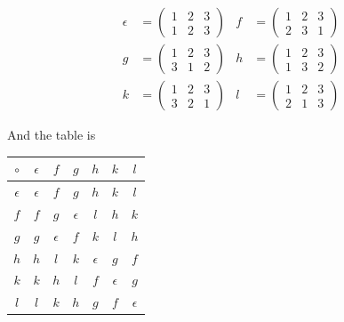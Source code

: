 \documentclass[twoside]{amsart}
\newcommand{\eps}{\ensuremath{\epsilon}\xspace}
\begin{document}
\begin{enumerate}[A.]
\begin{enumerate}[1]
      \begin{align*}
          \eps &= \begin{pmatrix}
	             1 & 2 & 3 \\
		     1 & 2 & 3
		  \end{pmatrix}
		  &
	  f    &= \begin{pmatrix}
	             1 & 2 & 3 \\
		     2 & 3 & 1
		  \end{pmatrix}
		  \\
	  g    &= \begin{pmatrix}
	             1 & 2 & 3 \\
		     3 & 1 & 2
		  \end{pmatrix}
		  &
          h    &= \begin{pmatrix}
	             1 & 2 & 3 \\
		     1 & 3 & 2
		  \end{pmatrix}
		  \\
	  k    &= \begin{pmatrix}
	             1 & 2 & 3 \\
		     3 & 2 & 1
		  \end{pmatrix}
		  &
	  l    &= \begin{pmatrix}
	             1 & 2 & 3 \\
		     2 & 1 & 3
		  \end{pmatrix}
      \end{align*}

      And the table is 
      
      \begin{center}
      \begin{tabular}{c|cccccc}
         $\circ$ & $\eps$ & $f$ & $g$ & $h$ & $k$ & $l$ \\ \hline
         $\eps$  & $\eps$ & $f$ & $g$ & $h$ & $k$ & $l$ \\
	 $f$     & $f$ & $g$ & $\eps$ & $l$ & $h$ & $k$ \\
	 $g$     & $g$ & $\eps$ & $f$ & $k$ & $l$ & $h$ \\
	 $h$     & $h$ & $l$ & $k$ & $\eps$ & $g$ & $f$ \\
	 $k$     & $k$ & $h$ & $l$ & $f$ & $\eps$ & $g$ \\
	 $l$     & $l$ & $k$ & $h$ & $g$ & $f$ & $\eps$
      \end{tabular}
      \end{center}

   \end{enumerate}


\end{enumerate}
\end{document}
